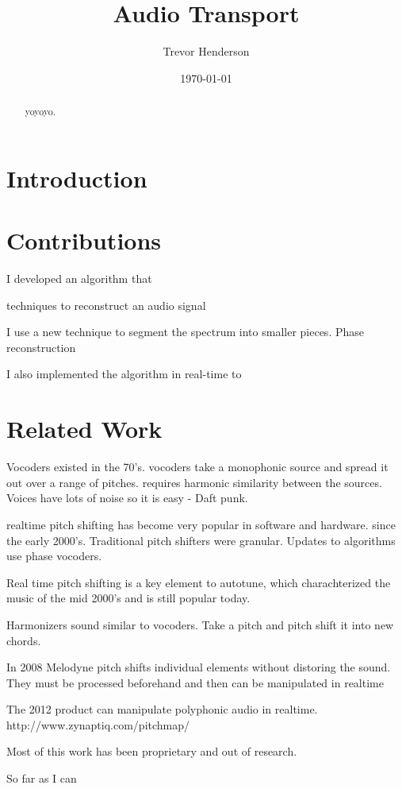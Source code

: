 \documentclass[12pt]{article}
\title{Audio Transport}
\date{\today}
\author{Trevor Henderson}
\begin{document}
\maketitle

\begin{abstract}
  yoyoyo.
\end{abstract}

\section{Introduction}

\section{Contributions}

I developed an algorithm that

techniques to
reconstruct an audio signal

I use a new technique to segment the spectrum into smaller pieces.
Phase reconstruction

I also implemented the algorithm in real-time to 

\section{Related Work}
Vocoders existed in the 70's.
vocoders take a monophonic source and spread it out over a range of pitches. requires harmonic similarity between the sources. Voices have lots of noise so it is easy - Daft punk. 

realtime pitch shifting has become very popular in software and hardware. since the early 2000's.
Traditional pitch shifters were granular.
Updates to algorithms use phase vocoders.

Real time pitch shifting is a key element to autotune, which charachterized the music of the mid 2000's and is still popular today.

Harmonizers sound similar to vocoders. Take a pitch and pitch shift it into new chords.

In 2008 Melodyne pitch shifts individual elements without distoring the sound.
They must be processed beforehand and then can be manipulated in realtime

The 2012 product can manipulate polyphonic audio in realtime.
http://www.zynaptiq.com/pitchmap/

Most of this work has been proprietary and out of research. 

So far as I can 
\end{document}
